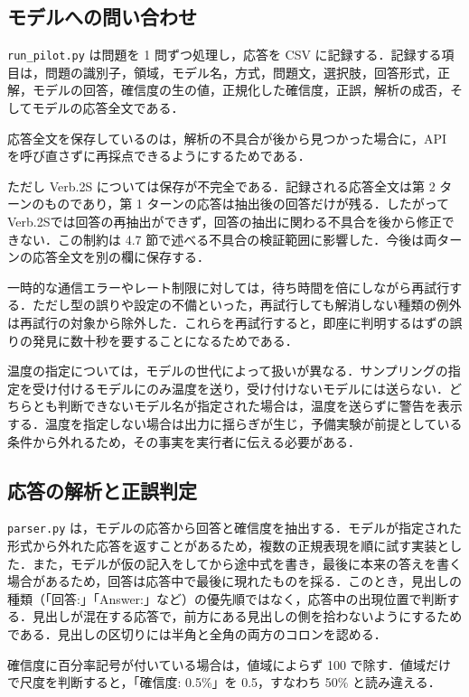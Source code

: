 \subsection{モデルへの問い合わせ}

\texttt{run\_\allowbreak{}pilot.\allowbreak{}py} は問題を 1 問ずつ処理し，応答を CSV に記録する．記録する項目は，問題の識別子，領域，モデル名，方式，問題文，選択肢，回答形式，正解，モデルの回答，確信度の生の値，正規化した確信度，正誤，解析の成否，そしてモデルの応答全文である．

応答全文を保存しているのは，解析の不具合が後から見つかった場合に，API を呼び直さずに再採点できるようにするためである．

ただし Verb.2S については保存が不完全である．記録される応答全文は第 2 ターンのものであり，第 1 ターンの応答は抽出後の回答だけが残る．したがって Verb.2Sでは回答の再抽出ができず，回答の抽出に関わる不具合を後から修正できない．この制約は 4.7 節で述べる不具合の検証範囲に影響した．今後は両ターンの応答全文を別の欄に保存する．

一時的な通信エラーやレート制限に対しては，待ち時間を倍にしながら再試行する．ただし型の誤りや設定の不備といった，再試行しても解消しない種類の例外は再試行の対象から除外した．これらを再試行すると，即座に判明するはずの誤りの発見に数十秒を要することになるためである．

温度の指定については，モデルの世代によって扱いが異なる．サンプリングの指定を受け付けるモデルにのみ温度を送り，受け付けないモデルには送らない．どちらとも判断できないモデル名が指定された場合は，温度を送らずに警告を表示する．温度を指定しない場合は出力に揺らぎが生じ，予備実験が前提としている条件から外れるため，その事実を実行者に伝える必要がある．

\subsection{応答の解析と正誤判定}

\texttt{parser.\allowbreak{}py} は，モデルの応答から回答と確信度を抽出する．モデルが指定された形式から外れた応答を返すことがあるため，複数の正規表現を順に試す実装とした．また，モデルが仮の記入をしてから途中式を書き，最後に本来の答えを書く場合があるため，回答は応答中で最後に現れたものを採る．このとき，見出しの種類（「回答:」「Answer:」など）の優先順ではなく，応答中の出現位置で判断する．見出しが混在する応答で，前方にある見出しの側を拾わないようにするためである．見出しの区切りには半角と全角の両方のコロンを認める．

確信度に百分率記号が付いている場合は，値域によらず 100 で除す．値域だけで尺度を判断すると，「確信度: 0.5\%」を 0.5，すなわち 50\% と読み違える．

